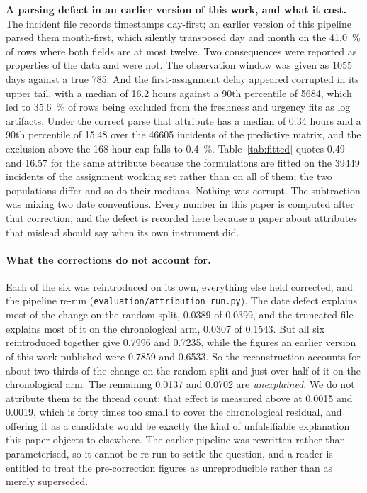 \textbf{A parsing defect in an earlier version of this work, and what it cost.} The incident
file records timestamps day-first; an earlier version of this pipeline parsed them month-first,
which silently transposed day and month on the \SI{41.0}{\percent} of rows where both fields
are at most twelve. Two consequences were reported as properties of the data and were not.
The observation window was given as \num{1055} days against a true \num{785}. And the
first-assignment delay appeared corrupted in its upper tail, with a median of \num{16.2}
hours against a 90th percentile of \num{5684}, which led to \SI{35.6}{\percent} of rows being
excluded from the freshness and urgency fits as log artifacts. Under the correct parse that
attribute has a median of \num{0.34} hours and a 90th percentile of \num{15.48} over the
\num{46605} incidents of the predictive matrix, and the exclusion above the \num{168}-hour cap
falls to \SI{0.4}{\percent}. Table~\ref{tab:fitted} quotes \num{0.49} and \num{16.57} for the same
attribute because the formulations are fitted on the \num{39449} incidents of the assignment
working set rather than on all of them; the two populations differ and so do their medians. Nothing was corrupt. The subtraction was mixing two
date conventions. Every number in this paper is computed after that correction, and the
defect is recorded here because a paper about attributes that mislead should say when its
own instrument did.

\paragraph{What the corrections do not account for.} Each of the six was reintroduced on
its own, everything else held corrected, and the pipeline re-run
(\texttt{evaluation/attribution\_run.py}). The date defect explains most of the change on
the random split, \num{0.0389} of \num{0.0399}, and the truncated file explains most of it
on the chronological arm, \num{0.0307} of \num{0.1543}. But all six reintroduced together
give \num{0.7996} and \num{0.7235}, while the figures an earlier version of this work
published were \num{0.7859} and \num{0.6533}. So the reconstruction accounts for about two
thirds of the change on the random split and just over half of it on the chronological arm.
The remaining \num{0.0137} and \num{0.0702} are \emph{unexplained}. We do not attribute
them to the thread count: that effect is measured above at \num{0.0015} and \num{0.0019},
which is forty times too small to cover the chronological residual, and offering it as a
candidate would be exactly the kind of unfalsifiable explanation this paper objects to
elsewhere. The earlier pipeline was rewritten rather than parameterised, so it cannot be
re-run to settle the question, and a reader is entitled to treat the pre-correction figures
as unreproducible rather than as merely superseded.

